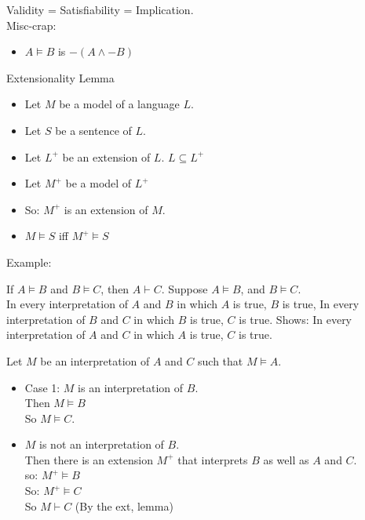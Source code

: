 Validity = Satisfiability = Implication.\\

Misc-crap:
\begin{itemize}
\item $A \vDash B$ is $-(A \wedge -B)$
\end{itemize}

\begin{lemma}
Extensionality Lemma\\
\begin{itemize}
\item Let $M$ be a model of a language $L$.
\item Let $S$ be a sentence of $L$.
\item Let $L^+$ be an extension of $L$. $L \subseteq L^+$
\item Let $M^+$ be a model of $L^+$
\item So: $M^+$ is an extension of $M$.
\item $M \vDash S$ iff $ M^+ \vDash S$
\end{itemize}
\end{lemma}
Example:

If $A \vDash B$ and $B \vDash C$, then $A \vdash C$.
Suppose $A \vDash B$, and $B \vDash C$.\\
In every interpretation of $A$ and $B$ in which $A$ is true, $B$ is true,
In every interpretation of $B$ and $C$ in which $B$ is true, $C$ is true.
Shows: In every interpretation of $A$ and $C$ in which $A$ is true, $C$ is true.

Let $M$ be an interpretation of $A$ and $C$ such that $M \vDash A$.
\begin{itemize}
\item Case 1:
$M$ is an interpretation of $B$. \\
Then $M \vDash B$ \\
So $M \vDash C$. \\
\item $M$ is not an interpretation of $B$. \\
Then there is an extension $M^+$ that interprets $B$ as well as $A$ and $C$. \\
so: $M^+ \vDash B$ \\
So: $M^+ \vDash C$ \\
So $M \vdash C$ (By the ext, lemma) \\
\end{itemize}


